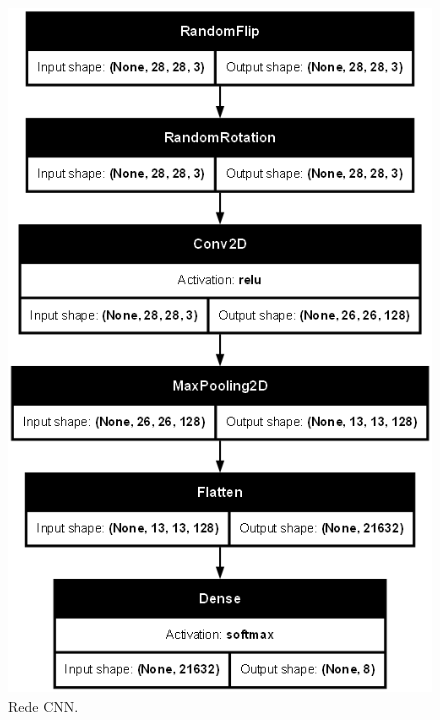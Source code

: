 \documentclass[final,5p]{elsarticle}
\numberwithin{equation}{section}
\begin{document}
        \begin{figure}[H]
            \includegraphics[width=0.95\columnwidth]{CNN_Simple_model.png}
            \caption{Rede CNN.}\label{fig:ModeloCNN}
        \end{figure}
\end{document}

